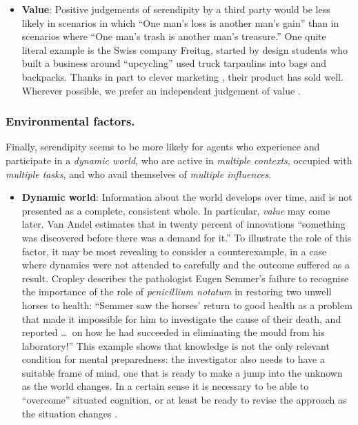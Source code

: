 
\begin{itemize}
\item \textbf{Value}: 
  Positive judgements of serendipity by a third party would be less
  likely in scenarios in which ``One man's loss is another man's
  gain'' than in scenarios where ``One man's trash is another man's
  treasure.''  One quite literal example is the Swiss
  company Freitag, started by design students who built a business
  around ``upcycling'' used truck tarpaulins into bags and backpacks.
  Thanks in part to clever marketing \cite[pp. 54--55,
    68--69,]{russo2010companies}, their product has sold well.
  Wherever possible, we prefer an independent judgement of value
  \cite{jordanous:12}.
\end{itemize}

\subsubsection*{Environmental factors.}

Finally, serendipity seems to be more likely for agents who experience and participate in a \emph{dynamic world}, who are active in \emph{multiple contexts}, occupied with \emph{multiple tasks}, and who avail themselves of \emph{multiple influences}.

\begin{itemize}
\item \textbf{Dynamic world}: Information about the world develops
  over time, and is not presented as a complete, consistent whole.  In
  particular, \emph{value} may come later.  Van Andel
  \citeyear[p. 643]{van1994anatomy} estimates that in twenty percent
  of innovations ``something was discovered before there was a demand
  for it.''  To illustrate the role of this factor, it may be most
  revealing to consider a counterexample, in a case where dynamics
  were not attended to carefully and the outcome suffered as a result.
  Cropley \citeyear{cropley2006praise} describes the pathologist Eugen
  Semmer's failure to recognise the importance of the role of
  \emph{penicillium notatum} in restoring two unwell horses to health:
  ``Semmer saw the horses' return to good health as a problem that
  made it impossible for him to investigate the cause of their death,
  and reported \ldots\ on how he had succeeded in eliminating the
  mould from his laboratory!''  This example shows that knowledge is
  not the only relevant condition for mental preparedness: the
  investigator also needs to have a suitable frame of mind, one that
  is ready to make a jump into the unknown as the world changes.  In a
  certain sense it is necessary to be able to ``overcome'' situated
  cognition, or at least be ready to revise the approach as the
  situation changes \cite{bereiter1997situated}.
\end{itemize}

